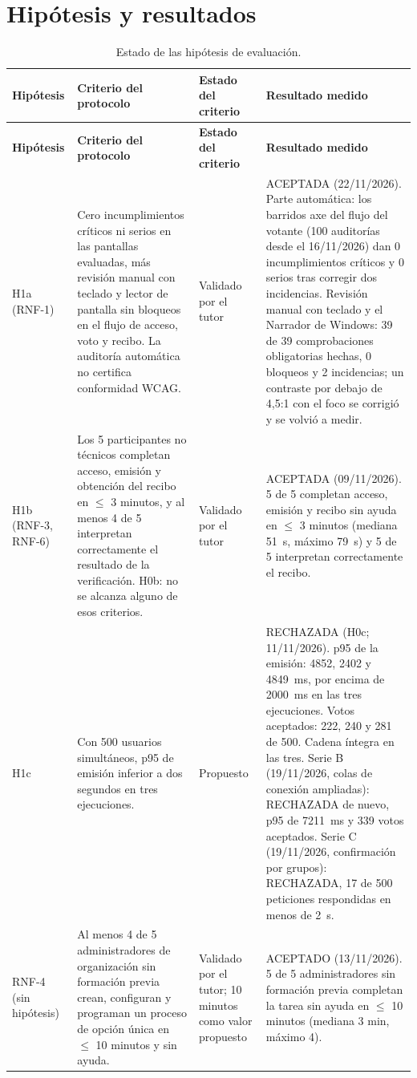 \section{Hipótesis y resultados}
\small
\begin{longtable}{|p{}|p{}|p{}|p{}|}
\caption{Estado de las hipótesis de evaluación.}\label{tab:estado-hipotesis}\\
\hline
\textbf{Hipótesis} & \textbf{Criterio del protocolo} & \textbf{Estado del criterio} & \textbf{Resultado medido} \\
\hline
\endfirsthead
\hline\textbf{Hipótesis} & \textbf{Criterio del protocolo} & \textbf{Estado del criterio} & \textbf{Resultado medido} \\
\hline\endhead
H1a \mbox{(RNF-1)} & Cero incumplimientos críticos ni serios en las pantallas evaluadas, más revisión manual con teclado y lector de pantalla sin bloqueos en el flujo de acceso, voto y recibo. La auditoría automática no certifica conformidad WCAG. & Validado por el tutor & ACEPTADA (22/11/2026). Parte automática: los barridos axe del flujo del votante (100 auditorías desde el 16/11/2026) dan 0 incumplimientos críticos y 0 serios tras corregir dos incidencias. Revisión manual con teclado y el Narrador de Windows: 39 de 39 comprobaciones obligatorias hechas, 0 bloqueos y 2 incidencias; un contraste por debajo de 4,5:1 con el foco se corrigió y se volvió a medir. \\
\hline
H1b \mbox{(RNF-3,} \mbox{RNF-6)} & Los 5 participantes no técnicos completan acceso, emisión y obtención del recibo en $\leq$ 3 minutos, y al menos 4 de 5 interpretan correctamente el resultado de la verificación. H0b: no se alcanza alguno de esos criterios. & Validado por el tutor & ACEPTADA (09/11/2026). 5 de 5 completan acceso, emisión y recibo sin ayuda en $\leq$ 3 minutos (mediana 51~s, máximo 79~s) y 5 de 5 interpretan correctamente el recibo. \\
\hline
H1c & Con 500 usuarios simultáneos, p95 de emisión inferior a dos segundos en tres ejecuciones. & Propuesto & RECHAZADA (H0c; 11/11/2026). p95 de la emisión: 4852, 2402 y 4849~ms, por encima de 2000~ms en las tres ejecuciones. Votos aceptados: 222, 240 y 281 de 500. Cadena íntegra en las tres. Serie B (19/11/2026, colas de conexión ampliadas): RECHAZADA de nuevo, p95 de 7211~ms y 339 votos aceptados. Serie C (19/11/2026, confirmación por grupos): RECHAZADA, 17 de 500 peticiones respondidas en menos de 2~s. \\
\hline
RNF-4 (sin hipótesis) & Al menos 4 de 5 administradores de organización sin formación previa crean, configuran y programan un proceso de opción única en $\leq$ 10 minutos y sin ayuda. & Validado por el tutor; 10 minutos como valor propuesto & ACEPTADO (13/11/2026). 5 de 5 administradores sin formación previa completan la tarea sin ayuda en $\leq$ 10 minutos (mediana 3 min, máximo 4). \\
\hline
\end{longtable}
\normalsize

